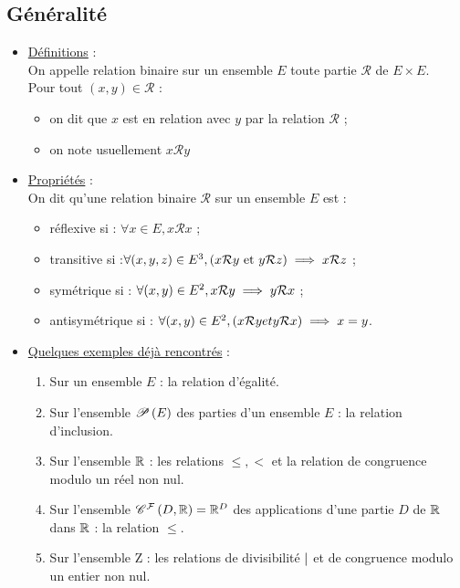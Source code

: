\subsection{Généralité}
\begin{defprop}
    \begin{itemize}
    \item \underline{Définitions} : \\
    On appelle relation binaire sur un ensemble \(E\) toute partie \(\mathcal{R}\) de \(E \times E\).\\
    Pour tout \((x, y) \in \mathcal{R}\) :
    \begin{itemize}
        \item on dit que \(x\) est en relation avec \(y\) par la relation \(\mathcal{R}\) ;
        \item on note usuellement \(x\mathcal{R}y\)
    \end{itemize}
    \item \underline{Propriétés} : \\
    On dit qu’une relation binaire \(\mathcal{R}\) sur un ensemble \(E\) est :
    \begin{itemize}
        \item réflexive si : \(\forall x \in E, x\mathcal{R}x\) ;
        \item transitive si :\(\forall (x, y, z) \in E^3, (x\mathcal{R}y \text{ et } y\mathcal{R}z)\imp x\mathcal{R}z\) ;
        \item symétrique si : \(\forall (x, y) \in E^2, x\mathcal{R}y \imp y\mathcal{R}x\) ;
        \item antisymétrique si : \(\forall (x, y) \in E^2, (x\mathcal{R}y et y\mathcal{R}x) \imp x = y\).
    \end{itemize}
    \item \underline{ Quelques exemples déjà rencontrés} : 
        \begin{enumerate}
            \item Sur un ensemble \(E\) : la relation d’égalité.
            \item Sur l’ensemble \(\P{E}\) des parties d’un ensemble \(E\) : la relation d’inclusion.
            \item Sur l’ensemble \(\R\) : les relations \(\leq, <\) et la relation de congruence modulo un réel non nul.
            \item Sur l’ensemble \(\ensclasse{\mathcal{F}}{D}{\R} = \R^D\) des applications d’une partie \(D\) de \(\R\) dans \(\R\) : la relation \(\leq\).
            \item Sur l’ensemble Z : les relations de divisibilité \(\divise\) et de congruence modulo un entier non nul.
        \end{enumerate}
    \end{itemize}
\end{defprop}


